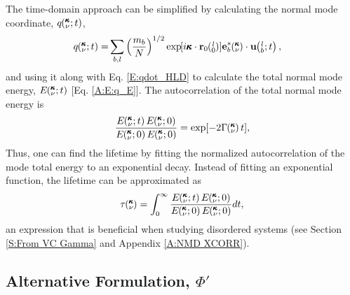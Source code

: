 The time-domain approach can be simplified by calculating the 
normal mode coordinate, $q\mspace{-4.0mu}\left(\mspace{-8.0mu} \begin{smallmatrix}&\pmb{\kappa} \\&\nu\end{smallmatrix} \mspace{-2.0mu};t\right)$, 
\begin{equation}\label{E:q_HLD}
\begin{split}
q\kvt=& \sum_{b,l} \left(\frac{m_b}{N}\right)^{1/2} \EXP{i\pmb{\kappa}
\cdot\mathbf{r}_0\ab{l}{0}} \mathbf{e}_b^*\kv \cdot \mathbf{u}\lbt,
\end{split}
\end{equation}
and using it along with Eq. \eqref{E:qdot_HLD} to calculate the 
total normal mode energy, $E\mspace{-4.0mu}\left(\mspace{-8.0mu} \begin{smallmatrix}&\pmb{\kappa} \\&\nu\end{smallmatrix} \mspace{-2.0mu};t\right)$ [Eq. \eqref{A:E:q_E}]. 
The autocorrelation of the total normal mode energy is 
\begin{equation}\label{E:E_xcorr}
\begin{split}
\frac{E\kvt E\kvzero}{E \kvzero E\kvzero} = \exp[-2 \Gamma \kv t],
\end{split}
\end{equation}
Thus, one can find the lifetime by fitting the normalized autocorrelation 
of the mode total energy to an exponential decay. Instead of fitting an 
exponential function, the lifetime can be approximated as
\begin{equation}\label{E:tau_E_xcorr}
\begin{split}
\tau \kv = \int_0^{\infty} \frac{E\kvt E\kvzero}{E \kvzero E\kvzero} 
dt,
\end{split}
\end{equation}
an expression that is beneficial when studying disordered systems 
(see Section \ref{S:From VC Gamma} and Appendix \ref{A:NMD XCORR}).  

\subsection{\label{S:Subsection_Proposed_SED}Alternative Formulation, 
$\Phi'$}

